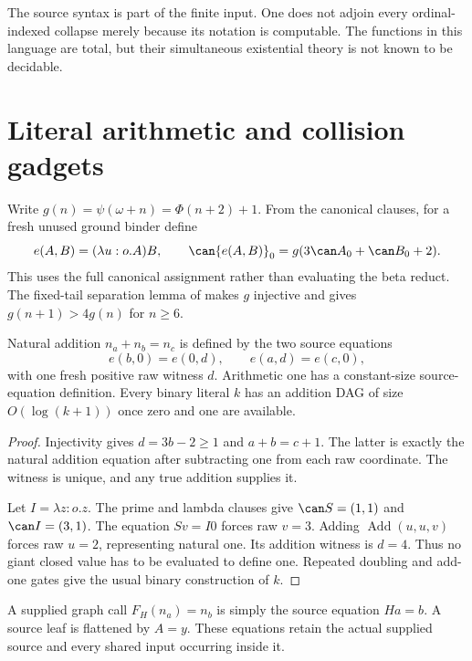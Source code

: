 \documentclass[11pt,a4paper]{article}
\begin{document}
The source syntax is part of the finite input.  One does not adjoin every
ordinal-indexed collapse merely because its notation is computable.  The
functions in this language are total, but their simultaneous existential
theory is not known to be decidable.

\section{Literal arithmetic and collision gadgets}\label{sec:gadgets}

Write $g(n)=\psi(\omega+n)=\Phi(n+2)+1$.  From the canonical clauses,
for a fresh unused ground binder define
\[
 e(A,B)=(\lambda u:o.A)B,\qquad
 \can{e(A,B)}_0=g(3\can A_0+\can B_0+2).
\]
This uses the full canonical assignment rather than evaluating the beta
reduct.  The fixed-tail separation lemma of \cite{wwfoundations} makes
$g$ injective and gives $g(n+1)>4g(n)$ for $n\ge6$.

\begin{lemma}\label{lem:addition}
Natural addition $n_a+n_b=n_c$ is defined by the two source equations
\[
 e(b,0)=e(0,d),\qquad e(a,d)=e(c,0),
\]
with one fresh positive raw witness $d$.  Arithmetic one has a constant-size
source-equation definition.  Every binary literal $k$ has an addition DAG
of size $O(\log(k+1))$ once zero and one are available.
\end{lemma}
\begin{proof}
Injectivity gives $d=3b-2\ge1$ and $a+b=c+1$.  The latter is exactly the
natural addition equation after subtracting one from each raw coordinate.
The witness is unique, and any true addition supplies it.

Let $I=\lambda z:o.z$.  The prime and lambda clauses give
$\can S=(1,1)$ and $\can I=(3,1)$.  The equation $Sv=I0$ forces raw
$v=3$.  Adding $\operatorname{Add}(u,u,v)$ forces raw $u=2$, representing
natural one.  Its addition witness is $d=4$.  Thus no giant closed value
has to be evaluated to define one.  Repeated doubling and add-one gates
give the usual binary construction of $k$.
\end{proof}

A supplied graph call $F_H(n_a)=n_b$ is simply the source equation $Ha=b$.
A source leaf is flattened by $A=y$.  These equations retain the actual
supplied source and every shared input occurring inside it.
\end{document}
